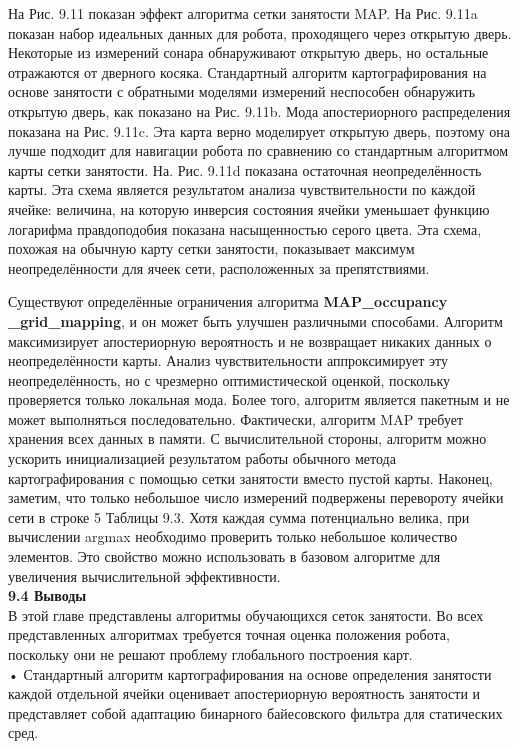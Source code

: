 \documentclass[10pt,a4paper]{article}
\begin{document}
На Рис. 9.11 показан эффект алгоритма сетки занятости MAP. На Рис. 9.11a показан набор идеальных данных для робота, проходящего через открытую дверь. Некоторые из измерений сонара обнаруживают открытую дверь, но остальные отражаются от дверного косяка. Стандартный алгоритм картографирования на основе занятости с обратными моделями измерений неспособен обнаружить открытую дверь, как показано на Рис. 9.11b. Мода апостериорного распределения показана на Рис. 9.11c. Эта карта верно моделирует открытую дверь, поэтому она лучше подходит для навигации робота по сравнению со стандартным алгоритмом карты сетки занятости. На. Рис. 9.11d показана остаточная неопределённость карты. Эта схема является результатом анализа чувствительности по каждой ячейке: величина, на которую инверсия состояния ячейки уменьшает функцию логарифма правдоподобия показана насыщенностью серого цвета. Эта схема, похожая на обычную карту сетки занятости, показывает максимум неопределённости для ячеек сети, расположенных за препятствиями.

Существуют определённые ограничения алгоритма \textbf{MAP\_occupancy \_grid\_mapping}, и он может быть улучшен различными способами. Алгоритм максимизирует апостериорную вероятность и не возвращает никаких данных о неопределённости карты. Анализ чувствительности аппроксимирует эту неопределённость, но с чрезмерно оптимистической оценкой, поскольку проверяется только локальная мода. Более того, алгоритм является пакетным и не может выполняться последовательно. Фактически, алгоритм MAP требует хранения всех данных в памяти. С вычислительной стороны, алгоритм можно ускорить инициализацией результатом работы обычного метода картографирования с помощью сетки занятости вместо пустой карты. Наконец, заметим, что только небольшое число измерений подвержены перевороту ячейки сети в строке 5 Таблицы 9.3. Хотя каждая сумма потенциально велика, при вычислении argmax необходимо проверить только небольшое количество элементов. Это свойство можно использовать в базовом алгоритме для увеличения вычислительной эффективности.\\

\textbf{9.4	Выводы}\\

В этой главе представлены алгоритмы обучающихся сеток занятости. Во всех представленных алгоритмах требуется точная оценка положения робота, поскольку они не решают проблему глобального построения карт.\\

•	Стандартный алгоритм картографирования на основе определения занятости каждой отдельной ячейки оценивает апостериорную вероятность занятости и представляет собой адаптацию бинарного байесовского фильтра для статических сред.\\
\end{document}
